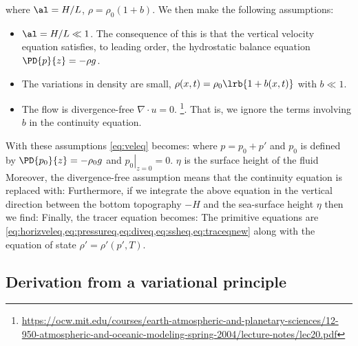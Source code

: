 	where $\al = H/L$, $\rho = \rho_{0}(1+b)$.
We then make the following assumptions:
\begin{itemize}
	\item $\al = H/L \ll 1$. The consequence of this is that the vertical velocity equation satisfies, to leading order, the hydrostatic balance equation $\PD{p}{z} = -\rho g$. 
	\item The variations in density are small, $\rho(x,t) = \rho_{0}\lrb{1 + b(x,t)}$ with $b\ll 1$. 
	\item The flow is divergence-free $\nabla\cdot u = 0$. \footnote{\url{https://ocw.mit.edu/courses/earth-atmospheric-and-planetary-sciences/12-950-atmospheric-and-oceanic-modeling-spring-2004/lecture-notes/lec20.pdf}}. That is, we ignore the terms involving $b$ in the continuity equation. 
\end{itemize}
With these assumptions \cref{eq:veleq} becomes:
where $p = p_{0} + p'$ and $p_{0}$ is defined by $\PD{p_{0}}{z} = -\rho_{0}g$ and $\left. p_{0}\right|_{z=0} = 0$. $\eta$ is the surface height of the fluid\\
\linebreak
Moreover, the divergence-free assumption means that the continuity equation is replaced with:
Furthermore, if we integrate the above equation in the vertical direction between the bottom topography $-H$ and the sea-surface height $\eta$ then we find:
Finally, the tracer equation becomes:
The primitive equations are \cref{eq:horizveleq,eq:pressureq,eq:diveq,eq:ssheq,eq:traceqnew} along with the equation of state $\rho' = \rho'(p',T)$. 

\subsection{Derivation from a variational principle}

